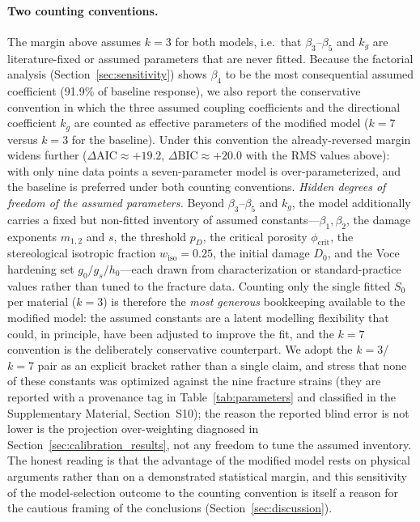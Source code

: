 \documentclass[twocolumn]{sagej}
\begin{document}
\paragraph{Two counting conventions.} The margin above assumes $k=3$ for both models, i.e.\ that $\beta_3$--$\beta_5$ and $k_g$ are literature-fixed or assumed parameters that are never fitted. Because the factorial analysis (Section~\ref{sec:sensitivity}) shows $\beta_4$ to be the most consequential assumed coefficient (91.9\% of baseline response), we also report the conservative convention in which the three assumed coupling coefficients and the directional coefficient $k_g$ are counted as effective parameters of the modified model ($k = 7$ versus $k = 3$ for the baseline). Under this convention the already-reversed margin widens further ($\Delta\mathrm{AIC} \approx +19.2$, $\Delta\mathrm{BIC} \approx +20.0$ with the RMS values above): with only nine data points a seven-parameter model is over-parameterized, and the baseline is preferred under both counting conventions. \emph{Hidden degrees of freedom of the assumed parameters.} Beyond $\beta_3$--$\beta_5$ and $k_g$, the model additionally carries a fixed but non-fitted inventory of assumed constants---$\beta_1, \beta_2$, the damage exponents $m_{1,2}$ and $s$, the threshold $p_D$, the critical porosity $\phi_{\text{crit}}$, the stereological isotropic fraction $w_{\mathrm{iso}} = 0.25$, the initial damage $D_0$, and the Voce hardening set $g_0/g_s/h_0$---each drawn from characterization or standard-practice values rather than tuned to the fracture data. Counting only the single fitted $S_0$ per material ($k=3$) is therefore the \emph{most generous} bookkeeping available to the modified model: the assumed constants are a latent modelling flexibility that could, in principle, have been adjusted to improve the fit, and the $k=7$ convention is the deliberately conservative counterpart. We adopt the $k=3$/$k=7$ pair as an explicit bracket rather than a single claim, and stress that none of these constants was optimized against the nine fracture strains (they are reported with a provenance tag in Table~\ref{tab:parameters} and classified in the Supplementary Material, Section~S10); the reason the reported blind error is not lower is the projection over-weighting diagnosed in Section~\ref{sec:calibration_results}, not any freedom to tune the assumed inventory. The honest reading is that the advantage of the modified model rests on physical arguments rather than on a demonstrated statistical margin, and this sensitivity of the model-selection outcome to the counting convention is itself a reason for the cautious framing of the conclusions (Section~\ref{sec:discussion}).
\end{document}
